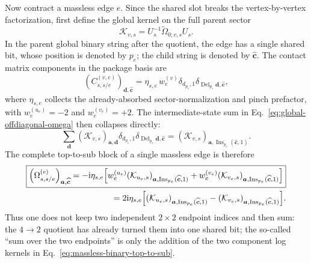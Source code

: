 \documentclass[11pt,a4paper]{article}
\newcommand{\ii}{\mathrm i}
\begin{document}
Now contract a massless edge $e$. Since the shared slot breaks the vertex-by-vertex factorization, first define the global kernel on the full parent sector
\begin{equation}
 \mathcal K_{v,s}=U_s^{-1}\widetilde\Omega_{0;v,s}U_s.
 \label{eq:global-component-log-kernel}
\end{equation}
In the parent global binary string after the quotient, the edge has a single shared bit, whose position is denoted by $p_e$; the child string is denoted by $\widehat{\bm c}$. The contact matrix components in the package basis are
\begin{equation}
 \left(C_{s,s/e}^{(v,e)}\right)_{\bm d,\widehat{\bm c}}
 =\eta_{s,e}\,w_e^{(v)}
 \delta_{d_{p_e},1}
 \delta_{\operatorname{Del}_{p_e}\bm d,\widehat{\bm c}},
 \label{eq:massless-contact-binary-component}
\end{equation}
where $\eta_{s,e}$ collects the already-absorbed sector-normalization and pinch prefactor, with $w_e^{(u_e)}=-2$ and $w_e^{(v_e)}=+2$. The intermediate-state sum in Eq.~\eqref{eq:global-offdiagonal-omega} then collapses directly:
\begin{equation}
 \sum_{\bm d}
 (\mathcal K_{v,s})_{\bm a,\bm d}
 \delta_{d_{p_e},1}
 \delta_{\operatorname{Del}_{p_e}\bm d,\widehat{\bm c}}
 =
 (\mathcal K_{v,s})_{\bm a,
 \operatorname{Ins}_{p_e}(\widehat{\bm c},1)}.
 \label{eq:massless-binary-sum-collapse}
\end{equation}
The complete top-to-sub block of a single massless edge is therefore
\begin{align}
 \boxed{
 \left(\Omega_{s,s/e}^{(e)}\right)_{\bm a,\widehat{\bm c}}
 =-\ii\eta_{s,e}\Big[
 w_e^{(u_e)}(\mathcal K_{u_e,s})_{\bm a,\operatorname{Ins}_{p_e}(\widehat{\bm c},1)}
 +w_e^{(v_e)}(\mathcal K_{v_e,s})_{\bm a,\operatorname{Ins}_{p_e}(\widehat{\bm c},1)}
 \Big]
 }
 \notag\\
 =2\ii\eta_{s,e}\Big[
 (\mathcal K_{u_e,s})_{\bm a,\operatorname{Ins}_{p_e}(\widehat{\bm c},1)}
 -(\mathcal K_{v_e,s})_{\bm a,\operatorname{Ins}_{p_e}(\widehat{\bm c},1)}
 \Big].
 \label{eq:massless-binary-top-to-sub}
\end{align}
Thus one does not keep two independent $2\times2$ endpoint indices and then sum: the $4\to2$ quotient has already turned them into one shared bit; the so-called ``sum over the two endpoints'' is only the addition of the two component log kernels in Eq.~\eqref{eq:massless-binary-top-to-sub}.
\end{document}

